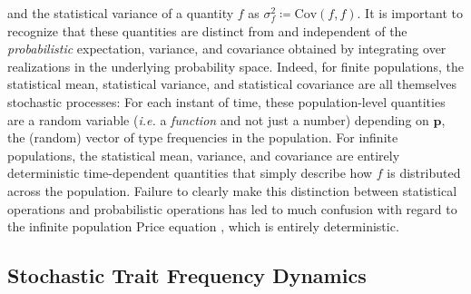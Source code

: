 and the statistical variance of a quantity $f$ as $\sigma^2_f \coloneqq \textrm{Cov}(f,f)$. It is important to recognize that these quantities are distinct from and independent of the \emph{probabilistic} expectation, variance, and covariance obtained by integrating over realizations in the underlying probability space. Indeed, for finite populations, the statistical mean, statistical variance, and statistical covariance are all themselves stochastic processes: For each instant of time, these population-level quantities are a random variable (\emph{i.e.} a \emph{function} and not just a number) depending on $\mathbf{p}$, the (random) vector of type frequencies in the population. For infinite populations, the statistical mean, variance, and covariance are entirely deterministic time-dependent quantities that simply describe how $f$ is distributed across the population. Failure to clearly make this distinction between statistical operations and probabilistic operations has led to much confusion with regard to the infinite population Price equation \citep{van_veelen_use_2005}, which is entirely deterministic.

\subsection{Stochastic Trait Frequency Dynamics}

